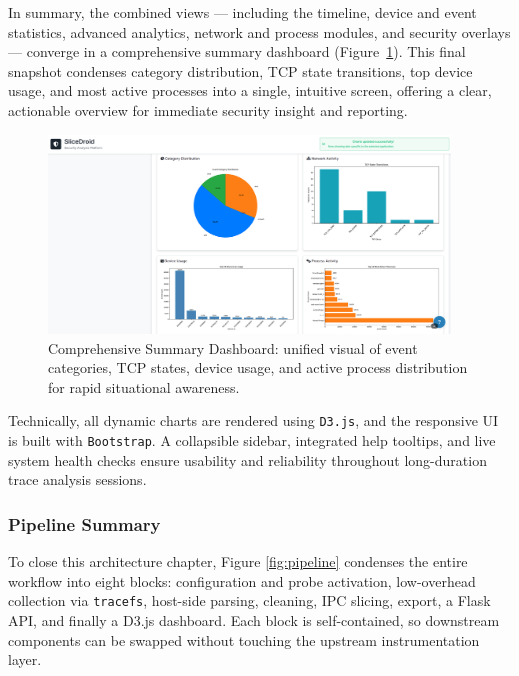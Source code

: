 \documentclass[a4paper,12pt]{report}
\begin{document}
In summary, the combined views — including the timeline, device and event statistics, advanced analytics, network and process modules, and security overlays — converge in a comprehensive summary dashboard (Figure~\ref{fig:summary_dashboard}). This final snapshot condenses category distribution, TCP state transitions, top device usage, and most active processes into a single, intuitive screen, offering a clear, actionable overview for immediate security insight and reporting.

\begin{figure}[H]
\centering
\includegraphics[width=0.95\textwidth]{security_overview-2.png.png}
\caption{Comprehensive Summary Dashboard: unified visual of event categories, TCP states, device usage, and active process distribution for rapid situational awareness.}
\label{fig:summary_dashboard}
\end{figure}

Technically, all dynamic charts are rendered using \texttt{D3.js}, and the responsive UI is built with \texttt{Bootstrap}. A collapsible sidebar, integrated help tooltips, and live system health checks ensure usability and reliability throughout long-duration trace analysis sessions.

\subsubsection{Pipeline Summary}

To close this architecture chapter, Figure \ref{fig:pipeline} condenses the entire workflow into eight blocks: configuration and probe activation, low-overhead collection via \texttt{tracefs}, host-side parsing, cleaning, IPC slicing, export, a Flask API, and finally a D3.js dashboard.  Each block is self-contained, so downstream components can be swapped without touching the upstream instrumentation layer.
\end{document}
